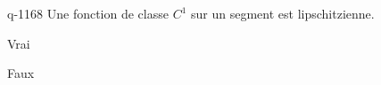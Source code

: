 \begin{truefalse}{q-1168}
Une fonction de classe $C^1$ sur un segment est lipschitzienne.
\item* Vrai
\item Faux
\end{truefalse}

